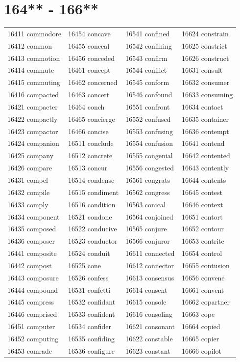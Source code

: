 \documentclass[10pt, oneside]{book}
\begin{document}
\begin{table}
	\centering
	\section*{164** - 166**}
	\begin{tabular}{l l l l}
16411 commodore &16454 concave &16541 confined &16624 constrain\\
16412 common &16455 conceal &16542 confining &16625 constrict\\
16413 commotion &16456 conceded &16543 confirm &16626 construct\\
16414 commute &16461 concept &16544 conflict &16631 consult\\
16415 commuting &16462 concerned &16545 conform &16632 consumer\\
16416 compacted &16463 concert &16546 confound &16633 consuming\\
16421 compacter &16464 conch &16551 confront &16634 contact\\
16422 compactly &16465 concierge &16552 confused &16635 container\\
16423 compactor &16466 concise &16553 confusing &16636 contempt\\
16424 companion &16511 conclude &16554 confusion &16641 contend\\
16425 company &16512 concrete &16555 congenial &16642 contented\\
16426 compare &16513 concur &16556 congested &16643 contently\\
16431 compel &16514 condense &16561 congrats &16644 contents\\
16432 compile &16515 condiment &16562 congress &16645 contest\\
16433 comply &16516 condition &16563 conical &16646 context\\
16434 component &16521 condone &16564 conjoined &16651 contort\\
16435 composed &16522 conducive &16565 conjure &16652 contour\\
16436 composer &16523 conductor &16566 conjuror &16653 contrite\\
16441 composite &16524 conduit &16611 connected &16654 control\\
16442 compost &16525 cone &16612 connector &16655 contusion\\
16443 composure &16526 confess &16613 consensus &16656 convene\\
16444 compound &16531 confetti &16614 consent &16661 convent\\
16445 compress &16532 confidant &16615 console &16662 copartner\\
16446 comprised &16533 confident &16616 consoling &16663 cope\\
16451 computer &16534 confider &16621 consonant &16664 copied\\
16452 computing &16535 confiding &16622 constable &16665 copier\\
16453 comrade &16536 configure &16623 constant &16666 copilot\\
	\end{tabular}
 \end{table}
\clearpage
\end{document}
